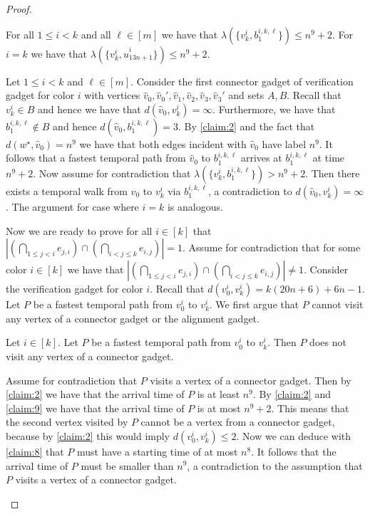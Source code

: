 \documentclass[a4paper,UKenglish,cleveref, autoref, thm-restate, anonymous]{lipics-v2021}
\begin{document}
\begin{proof}
\begin{claim}\label{claim:9}
    For all $1\le i< k$ and all $\ell\in[m]$ we have that $\lambda(\{v_k^i,b^{i,k,\ell}_{1}\})\le n^9+2$.
    For $i=k$ we have that $\lambda(\{v_{k}^i,\hat{u}^i_{13n+1}\})\le n^9+2$.
%
\end{claim}
\begin{claimproof}
    Let $1\le i< k$ and $\ell\in[m]$.
    Consider the first connector gadget of verification gadget for color $i$ with vertices $\hat{v}_0,\hat{v}_0',\hat{v}_1,\hat{v}_2,\hat{v}_3,\hat{v}_3'$ and sets $A,B$. Recall that $v_k^i\in B$ and hence we have that $d(\hat{v}_0,v_k^i)=\infty$. Furthermore, we have that $b^{i,k,\ell}_{1}\notin B$ and hence $d(\hat{v}_0,b^{i,k,\ell}_{1})=3$. By \cref{claim:2} and the fact that $d(w^\star,\hat{v}_0)=n^9$ we have that both edges incident with $\hat{v}_0$ have label $n^9$. It follows that a fastest temporal path from $\hat{v}_0$ to $b^{i,k,\ell}_{1}$ arrives at $b^{i,k,\ell}_{1}$ at time $n^9+2$. Now assume for contradiction that $\lambda(\{v_k^i,b^{i,k,\ell}_{1}\})> n^9+2$. Then there exists a temporal walk from $\hat{v}_0$ to $v_k^i$ via $b^{i,k,\ell}_{1}$, a contradiction to $d(\hat{v}_0,v_k^i)=\infty$.
    The argument for case where $i=k$ is analogous.
\end{claimproof}

Now we are ready to prove for all $i\in [k]$ that $|(\bigcap_{1\le j<i} e_{j,i}) \cap (\bigcap_{i<j\le k} e_{i,j})|=1$. Assume for contradiction that for some color $i\in[k]$ we have that $|(\bigcap_{1\le j<i} e_{j,i}) \cap (\bigcap_{i<j\le k} e_{i,j})|\neq 1$. 
Consider the verification gadget for color $i$. Recall that $d(v_0^i,v_k^i)=k(20n+6)+6n-1$. Let $P$ be a fastest temporal path from $v_0^i$ to $v_k^i$.
We first argue that $P$ cannot visit any vertex of a connector gadget or the alignment gadget. 

\begin{claim}\label{claim:10}
Let $i\in[k]$. Let $P$ be a fastest temporal path from $v_0^i$ to $v_k^i$. Then $P$ does not visit any vertex of a connector gadget.
\end{claim}
\begin{claimproof}
Assume for contradiction that $P$ visits a vertex of a connector gadget. Then by \cref{claim:2} we have that the arrival time of $P$ is at least $n^9$. By \cref{claim:2} and \cref{claim:9} we have that the arrival time of $P$ is at most $n^9+2$. This means that the second vertex visited by $P$ cannot be a vertex from a connector gadget, because by \cref{claim:2} this would imply $d(v_0^i,v_k^i)\le 2$. Now we can deduce with \cref{claim:8} that $P$ must have a starting time of at most $n^8$. It follows that the arrival time of $P$ must be smaller than $n^9$, a contradiction to the assumption that $P$ visits a vertex of a connector gadget. 
\end{claimproof}


\end{proof}
\end{document}
